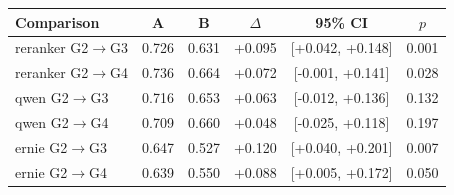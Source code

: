 \begin{tabular}{lccccc}
\toprule
Comparison & A & B & $\Delta$ & 95\% CI & $p$\\
\midrule
reranker G2$\to$G3 & 0.726 & 0.631 & +0.095 & [+0.042, +0.148] & 0.001 \\
reranker G2$\to$G4 & 0.736 & 0.664 & +0.072 & [-0.001, +0.141] & 0.028 \\
qwen G2$\to$G3 & 0.716 & 0.653 & +0.063 & [-0.012, +0.136] & 0.132 \\
qwen G2$\to$G4 & 0.709 & 0.660 & +0.048 & [-0.025, +0.118] & 0.197 \\
ernie G2$\to$G3 & 0.647 & 0.527 & +0.120 & [+0.040, +0.201] & 0.007 \\
ernie G2$\to$G4 & 0.639 & 0.550 & +0.088 & [+0.005, +0.172] & 0.050 \\
\bottomrule
\end{tabular}
